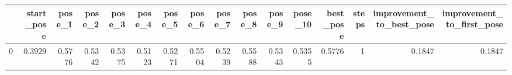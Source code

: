 \begin{tabular}{lrrrrrrrrrrrrrrr}
\toprule
{} &  start\_pose &  pose\_1 &  pose\_2 &  pose\_3 &  pose\_4 &  pose\_5 &  pose\_6 &  pose\_7 &  pose\_8 &  pose\_9 &  pose\_10 &  best\_pose &  steps &  improvement\_to\_best\_pose &  improvement\_to\_first\_pose \\
\midrule
0 &      0.3929 &  0.5776 &  0.5342 &  0.5375 &  0.5123 &  0.5271 &  0.5504 &  0.5239 &  0.5588 &  0.5343 &   0.5355 &     0.5776 &      1 &                    0.1847 &                     0.1847 \\
\bottomrule
\end{tabular}
